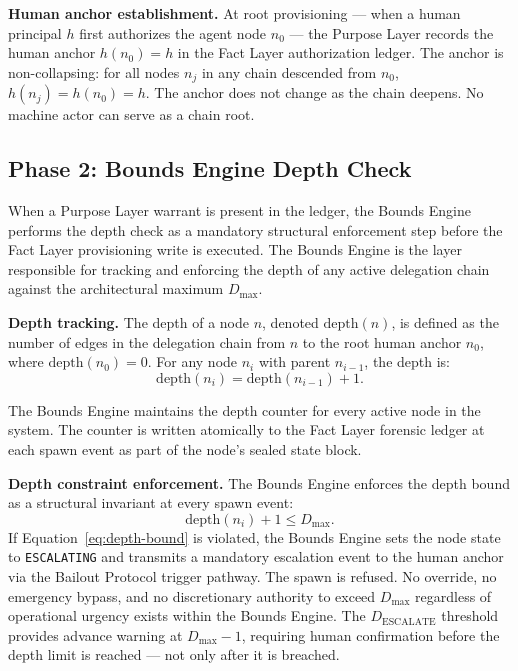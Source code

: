 \medskip
\noindent\textbf{Human anchor establishment.} At root provisioning --- when a human principal $h$ first authorizes the agent node $n_0$ --- the Purpose Layer records the human anchor $h(n_0) = h$ in the Fact Layer authorization ledger. The anchor is non-collapsing: for all nodes $n_j$ in any chain descended from $n_0$, $h(n_j) = h(n_0) = h$. The anchor does not change as the chain deepens. No machine actor can serve as a chain root.

\subsection{Phase 2: Bounds Engine Depth Check}
\label{sec:rs-phase2-bounds}

When a Purpose Layer warrant is present in the ledger, the Bounds Engine performs the depth check as a mandatory structural enforcement step before the Fact Layer provisioning write is executed. The Bounds Engine is the \bxthree{} layer responsible for tracking and enforcing the depth of any active delegation chain against the architectural maximum $D_{\max}$.

\medskip
\noindent\textbf{Depth tracking.} The depth of a node $n$, denoted $\text{depth}(n)$, is defined as the number of edges in the delegation chain from $n$ to the root human anchor $n_0$, where $\text{depth}(n_0) = 0$. For any node $n_i$ with parent $n_{i-1}$, the depth is:
\begin{equation}
\text{depth}(n_i) = \text{depth}(n_{i-1}) + 1.
\label{eq:depth-definition}
\end{equation}

The Bounds Engine maintains the depth counter for every active node in the system. The counter is written atomically to the Fact Layer forensic ledger at each spawn event as part of the node's sealed state block.

\medskip
\noindent\textbf{Depth constraint enforcement.} The Bounds Engine enforces the depth bound as a structural invariant at every spawn event:
\begin{equation}
\text{depth}(n_i) + 1 \leq D_{\max}.
\label{eq:depth-bound}
\end{equation}
If Equation~\ref{eq:depth-bound} is violated, the Bounds Engine sets the node state to \texttt{ESCALATING} and transmits a mandatory escalation event to the human anchor via the Bailout Protocol trigger pathway. The spawn is refused. No override, no emergency bypass, and no discretionary authority to exceed $D_{\max}$ regardless of operational urgency exists within the Bounds Engine. The $D_{\text{ESCALATE}}$ threshold provides advance warning at $D_{\max} - 1$, requiring human confirmation before the depth limit is reached --- not only after it is breached.

